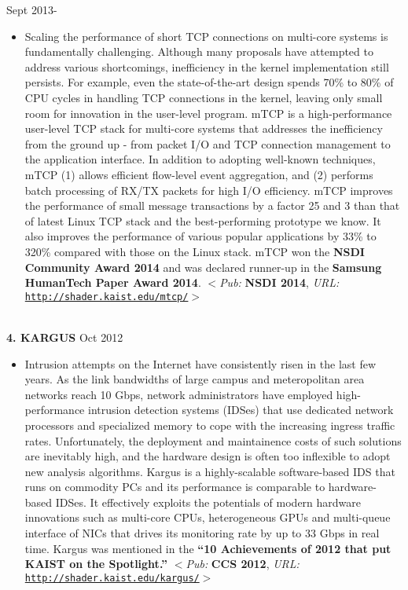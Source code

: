 \documentclass[10pt]{article}
\newenvironment{outerlist}[1][\enskip\textbullet]%
        {\begin{itemize}[#1]}{\end{itemize}%
         \vspace{-.6\baselineskip}}
\begin{document}
        \hfill {Sept 2013-}
\begin{outerlist}
\item[] {Scaling the performance of short TCP connections on multi-core systems is fundamentally challenging. Although many proposals have attempted to address various shortcomings, inefficiency in the kernel implementation still persists. For example, even the state-of-the-art design spends 70\% to 80\% of CPU cycles in handling TCP connections in the kernel, leaving only small room for innovation in the user-level program. mTCP is a high-performance user-level TCP stack for multi-core systems that addresses the inefficiency from the ground up - from packet I/O and TCP connection management to the application interface. In addition to adopting well-known techniques, mTCP (1) allows efficient flow-level event aggregation, and (2) performs batch processing of RX/TX packets for high I/O efficiency. mTCP improves the performance of small message transactions by a factor 25 and 3 than that of latest Linux TCP stack and the best-performing prototype we know. It also improves the performance of various popular applications by 33\% to 320\% compared with those on the Linux stack. mTCP won the {\bf NSDI Community Award 2014} and was declared runner-up in the {\bf Samsung HumanTech Paper Award 2014}. $<$\textit{Pub:} {\bf NSDI 2014}, \textit{URL:} \href{http://shader.kaist.edu/mtcp/}{\texttt{http://shader.kaist.edu/mtcp/}}$>$} %
\end{outerlist}
\ \\
{\textbf{4. K{\footnotesize ARGUS}}}
        \hfill {Oct 2012}
\begin{outerlist}
\item[] {Intrusion attempts on the Internet have consistently risen in the last few years. As the link bandwidths of large campus and meteropolitan area networks reach 10 Gbps, network administrators have employed high-performance intrusion detection systems (IDSes) that use dedicated network processors and specialized memory to cope with the increasing ingress traffic rates. Unfortunately, the deployment and maintainence costs of such solutions are inevitably high, and the hardware design is often too inflexible to adopt new analysis algorithms. Kargus is a highly-scalable software-based IDS that runs on commodity PCs and its performance is comparable to hardware-based IDSes. It effectively exploits the potentials of modern hardware innovations such as multi-core CPUs, heterogeneous GPUs and multi-queue interface of NICs that drives its monitoring rate by up to 33 Gbps in real time. Kargus was mentioned in the {\bf ``10 Achievements of 2012 that put KAIST on the Spotlight.''} $<$\textit{Pub:} {\bf CCS 2012}, \textit{URL:} \href{http://shader.kaist.edu/kargus/}{\texttt{http://shader.kaist.edu/kargus/}}$>$}
\end{outerlist}
\end{document}
